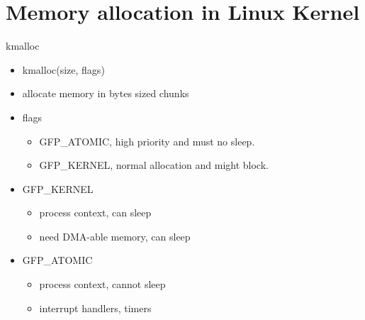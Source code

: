 \documentclass{workshop}
\begin{document}
\section{Memory allocation in Linux Kernel}

\begin{frame}{kmalloc}
  \begin{itemize}
    \item kmalloc(size, flags)
    \item allocate memory in bytes sized chunks
     \item flags
    \begin{itemize}
	\item GFP_ATOMIC, high priority and must no sleep.
	\item GFP_KERNEL, normal allocation and might block.
    \end{itemize}
  \item GFP_KERNEL
	\begin{itemize}
	\item process context, can sleep
	\item need DMA-able memory, can sleep
	\end{itemize}
   \item GFP_ATOMIC
	\begin{itemize}
	\item process context, cannot sleep
	\item interrupt handlers, timers
	\end{itemize}
  \end{itemize}
\end{frame}
\end{document}
